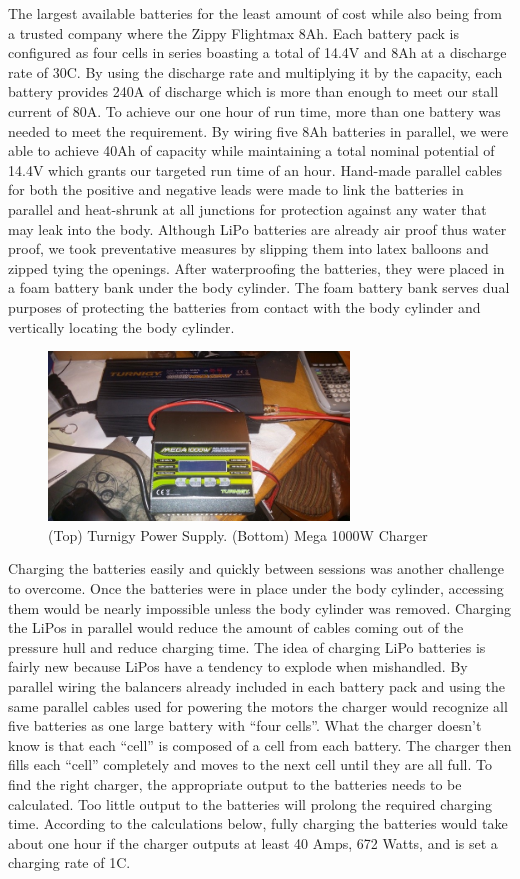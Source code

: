 \documentclass{report}
\begin{document}
The largest available batteries for the least amount of cost while also being from a trusted company where the Zippy Flightmax 8Ah.  Each battery pack is configured as four cells in series boasting a total of 14.4V and 8Ah at a discharge rate of 30C.  By using the discharge rate and multiplying it by the capacity, each battery provides 240A of discharge which is more than enough to meet our stall current of 80A.  To achieve our one hour of run time, more than one battery was needed to meet the requirement.  By wiring five 8Ah batteries in parallel, we were able to achieve 40Ah of capacity while maintaining a total nominal potential of 14.4V which grants our targeted run time of an hour.  Hand-made parallel cables for both the positive and negative leads were made to link the batteries in parallel and heat-shrunk at all junctions for protection against any water that may leak into the body.  Although LiPo batteries are already air proof thus water proof, we took preventative measures by slipping them into latex balloons and zipped tying the openings.  After waterproofing the batteries, they were placed in a foam battery bank under the body cylinder.  The foam battery bank serves dual purposes of protecting the batteries from contact with the body cylinder and vertically locating the body cylinder.\par
\begin{figure}[H]
\centering
\includegraphics[width=8cm]{"charger"}
\caption{(Top) Turnigy Power Supply. (Bottom) Mega 1000W Charger}
\end{figure}
Charging the batteries easily and quickly between sessions was another challenge to overcome.  Once the batteries were in place under the body cylinder, accessing them would be nearly impossible unless the body cylinder was removed.  Charging the LiPos in parallel would reduce the amount of cables coming out of the pressure hull and reduce charging time.  The idea of charging LiPo batteries is fairly new because LiPos have a tendency to explode when mishandled.  By parallel wiring the balancers already included in each battery pack and using the same parallel cables used for powering the motors the charger would recognize all five batteries as one large battery with “four cells”.  What the charger doesn’t know is that each “cell” is composed of a cell from each battery.  The charger then fills each “cell” completely and moves to the next cell until they are all full.  To find the right charger, the appropriate output to the batteries needs to be calculated.  Too little output to the batteries will prolong the required charging time.  According to the calculations below, fully charging the batteries would take about one hour if the charger outputs at least 40 Amps, 672 Watts, and is set a charging rate of 1C. 
\end{document}
